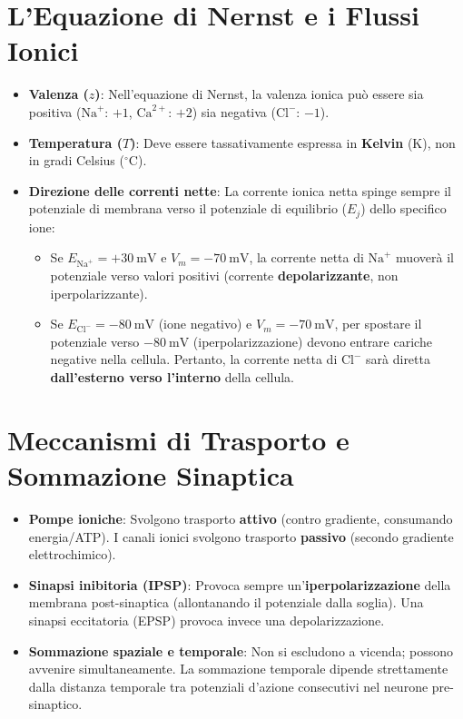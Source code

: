 \documentclass[10pt, letterpaper]{report}
\begin{document}
\section{L'Equazione di Nernst e i Flussi Ionici}
\begin{itemize}
    \item \textbf{Valenza (\(z\))}: Nell'equazione di Nernst, la valenza ionica può essere sia positiva (\(\text{Na}^+\): \(+1\), \(\text{Ca}^{2+}\): \(+2\)) sia negativa (\(\text{Cl}^-\): \(-1\)).
    \item \textbf{Temperatura (\(T\))}: Deve essere tassativamente espressa in \textbf{Kelvin} (\(\text{K}\)), non in gradi Celsius (\(^\circ\text{C}\)).
    \item \textbf{Direzione delle correnti nette}: La corrente ionica netta spinge sempre il potenziale di membrana verso il potenziale di equilibrio (\(E_j\)) dello specifico ione:
    \begin{itemize}
        \item Se \(E_{\text{Na}^+} = +30\ \text{mV}\) e \(V_m = -70\ \text{mV}\), la corrente netta di \(\text{Na}^+\) muoverà il potenziale verso valori positivi (corrente \textbf{depolarizzante}, non iperpolarizzante).
        \item Se \(E_{\text{Cl}^-} = -80\ \text{mV}\) (ione negativo) e \(V_m = -70\ \text{mV}\), per spostare il potenziale verso \(-80\ \text{mV}\) (iperpolarizzazione) devono entrare cariche negative nella cellula. Pertanto, la corrente netta di \(\text{Cl}^-\) sarà diretta \textbf{dall'esterno verso l'interno} della cellula.
    \end{itemize}
\end{itemize}

\section{Meccanismi di Trasporto e Sommazione Sinaptica}
\begin{itemize}
    \item \textbf{Pompe ioniche}: Svolgono trasporto \textbf{attivo} (contro gradiente, consumando energia/ATP). I canali ionici svolgono trasporto \textbf{passivo} (secondo gradiente elettrochimico).
    \item \textbf{Sinapsi inibitoria (IPSP)}: Provoca sempre un'\textbf{iperpolarizzazione} della membrana post-sinaptica (allontanando il potenziale dalla soglia). Una sinapsi eccitatoria (EPSP) provoca invece una depolarizzazione.
    \item \textbf{Sommazione spaziale e temporale}: Non si escludono a vicenda; possono avvenire simultaneamente. La sommazione temporale dipende strettamente dalla distanza temporale tra potenziali d'azione consecutivi nel neurone pre-sinaptico.
\end{itemize}
\end{document}
